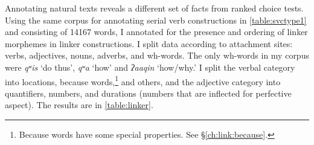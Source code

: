\begin{comment}
\ex \label{speakingoutside1}
\begingl
\glpreamble ƛ̓aaʔaasḥiis ciiqmałap. //
\gla ƛ̓aaʔaas-(q)ḥ=(y)iis ciiqmałapa //
\glb outide-\textsc{link}=\textsc{weak.1sg} speak.publicly //
\glft `I'm speaking outside.' (\textbf{Q}, Sophie Billy) //
\endgl
\xe

\ex~ \label{speakingoutside2}
\begingl
\glpreamble ciiqmałapayiis hiłḥ ƛ̓aaʔaas. //
\gla ciiqmałapa=(y)iis hił-(q)ḥ ƛ̓aaʔaas //
\glb speak.publicly=\textsc{weak.1sg} be.at-\textsc{link} outside //
\glft `I'm speaking outside.' (\textbf{Q}, Sophie Billy) //
\endgl
\xe

\ex~ \label{*speakingoutside3}
\begingl
\glpreamble *ciiqmałapḥiis ƛ̓aaʔaas. //
\gla ciiqmałapa-(q)ḥ=(y)iis hił-(q)ḥ ƛ̓aaʔaas //
\glb speak.publicly-\textsc{link}=\textsc{weak.1sg} be.at-\textsc{link} outside //
\glft Intended: `I'm speaking outside.' (\textbf{Q}, Sophie Billy) //
\endgl
\xe
\end{comment}

Annotating natural texts reveals a different set of facts from ranked choice tests. Using the same corpus for annotating serial verb constructions in  \cref{table:svctype1} and consisting of 14167 words, I annotated for the presence and ordering of linker morphemes in linker constructions. I split data according to attachment sites: verbs, adjectives, nouns, adverbs, and wh-words. The only wh-words in my corpus were \textit{qʷis} `do thus', \textit{qʷa} `how' and \textit{ʔaaqin} `how/why.' I split the verbal category into locations, because words,\footnote{Because words have some special properties. See \S\ref{ch:link:because}.} and others, and the adjective category into quantifiers, numbers, and durations (numbers that are inflected for perfective aspect). The results are in \cref{table:linker}.

